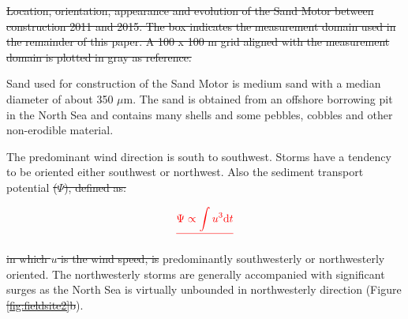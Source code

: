 \documentclass[preprint,12pt,authoryear,a4paper]{elsarticle}
\providecommand{\DIFadd}[1]{{\protect\color{blue}\uwave{#1}}} %
\providecommand{\DIFdel}[1]{{\protect\color{red}\sout{#1}}}                      %
\providecommand{\DIFaddbegin}{} %
\providecommand{\DIFaddend}{} %
\providecommand{\DIFdelbegin}{} %
\providecommand{\DIFdelend}{} %
\providecommand{\DIFdelFL}[1]{\DIFdel{#1}} %
\begin{document}
\DIFdelbegin %
{%
\DIFdelFL{Location, orientation, appearance and evolution of the Sand
    Motor between construction 2011 and 2015. The box indicates the
    measurement domain used in the remainder of this paper. A 100 x
    100 m grid aligned with the measurement domain is plotted in gray
    as reference.}}
\DIFdelend \DIFaddbegin {}
\DIFaddend 

Sand used for construction of the Sand Motor is medium sand with a
median diameter of about 350 $\mu \mathrm{m}$. The sand is obtained
from an offshore borrowing pit in the North Sea and contains many
shells and some pebbles, cobbles and other non-erodible material.

The predominant wind direction is south to southwest. Storms have a
tendency to be oriented either southwest or northwest. Also the
sediment transport potential
\DIFdelbegin \DIFdel{($\Psi$), defined as:
}%

\begin{displaymath}
  \DIFdel{\label{eq:transport_potential}
  \Psi \propto \int u^3 \mathrm{d}t
}\end{displaymath}

\DIFdel{in which $u$ is the wind speed, is }\DIFdelend \DIFaddbegin {}
\DIFadd{is }\DIFaddend predominantly southwesterly or northwesterly oriented. The
northwesterly storms are generally accompanied with significant surges
as the North Sea is virtually unbounded in northwesterly direction
(Figure \DIFdelbegin \DIFdel{\ref{fig:fieldsite2}b}\DIFdelend \DIFaddbegin \DIFadd{\ref{fig:map}, second panel}\DIFaddend ).
\end{document}
